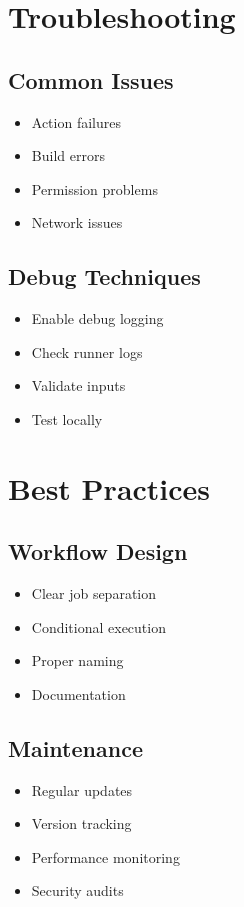 \documentclass{article}
\begin{document}
\section{Troubleshooting}

\subsection{Common Issues}
\begin{itemize}
    \item Action failures
    \item Build errors
    \item Permission problems
    \item Network issues
\end{itemize}

\subsection{Debug Techniques}
\begin{itemize}
    \item Enable debug logging
    \item Check runner logs
    \item Validate inputs
    \item Test locally
\end{itemize}

\section{Best Practices}

\subsection{Workflow Design}
\begin{itemize}
    \item Clear job separation
    \item Conditional execution
    \item Proper naming
    \item Documentation
\end{itemize}

\subsection{Maintenance}
\begin{itemize}
    \item Regular updates
    \item Version tracking
    \item Performance monitoring
    \item Security audits
\end{itemize}
\end{document}

